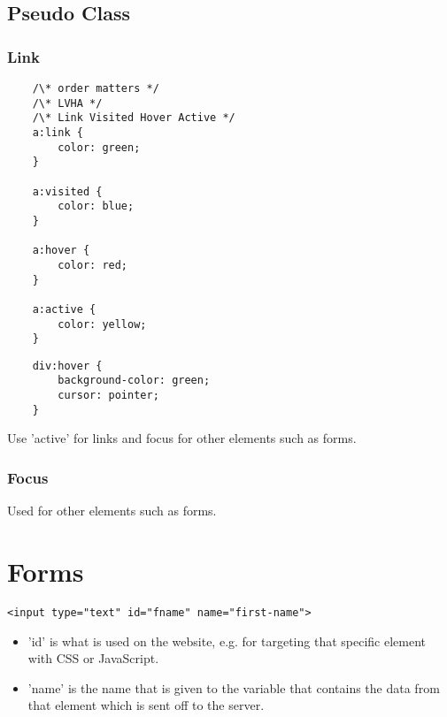 \documentclass[]{article}
\begin{document}
\subsection{Pseudo Class}
\subsubsection{Link}
\begin{lstlisting}
	/\* order matters */
	/\* LVHA */
	/\* Link Visited Hover Active */
	a:link {
		color: green;
	}
	
	a:visited {
		color: blue;
	}
	
	a:hover {
		color: red;
	}
	
	a:active {
		color: yellow;
	}
\end{lstlisting}

\begin{lstlisting}
	div:hover {
		background-color: green;
		cursor: pointer;
	}
\end{lstlisting}
Use 'active' for links and focus for other elements such as forms.

\subsubsection{Focus}
Used for other elements such as forms.

\section{Forms}
\begin{lstlisting}
<input type="text" id="fname" name="first-name">
\end{lstlisting}
\begin{itemize}
	\item 'id' is what is used on the website, e.g. for targeting that specific element with CSS or JavaScript.
	\item 'name' is the name that is given to the variable that contains the data from that element which is sent off to the server.
\end{itemize}
\end{document}
